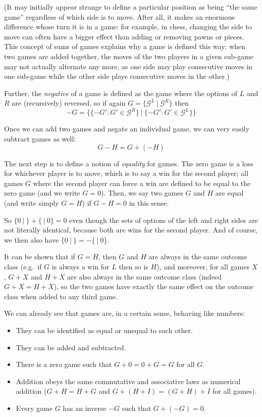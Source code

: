 \documentclass[a4paper,twocolumn]{article}
\newcommand{\cgtgame}[2]{\{#1 \:|\: #2\}}
\begin{document}
(It may initially appear strange to define a particular position as
being ``the same game'' regardless of which side is to move. After
all, it makes an enormous difference whose turn it is in a game: for
example, in chess, changing the side to move can often have a bigger
effect than adding or removing pawns or pieces. This concept of sums
of games explains why a game is defined this way: when two games are
added together, the moves of the two players in a given sub-game may
not actually alternate any more, as one side may play consecutive
moves in one sub-game while the other side plays consecutive moves in
the other.)

Further, the \emph{negative} of a game is defined as the game where
the options of $L$ and $R$ are (recursively) reversed, so if again $G
= \cgtgame{\mathcal{G}^L}{\mathcal{G}^R}$ then $$-G = \cgtgame{\{-G' :
  G' \in \mathcal{G}^R\}}{\{-G' : G' \in \mathcal{G}^L\}}$$

Once we can add two games and negate an individual game, we can very
easily subtract games as well: $$G - H = G + (-H)$$

The next step is to define a notion of \emph{equality} for games. The
zero game is a loss for whichever player is to move, which is to say a
win for the second player; all games $G$ where the second player can
force a win are defined to be equal to the zero game (and we write $G
= 0$). Then, we say two games $G$ and $H$ are equal (and write simply
$G = H$) if $G - H = 0$ in this sense.

So $\cgtgame{0}{} + \cgtgame{}{0} = 0$ even though the sets of options
of the left and right sides are not literally identical, because both
are wins for the second player. And of course, we then also have
$\cgtgame{0}{} = -\cgtgame{}{0}$.

It can be shown that if $G = H$, then $G$ and $H$ are always in the
same outcome class (e.g.\ if $G$ is always a win for $L$ then so is
$H$), and moreover, for all games $X$, $G+X$ and $H+X$ are also always
in the same outcome class (indeed $G+X = H+X$), so the two games have
exactly the same effect on the outcome class when added to any third
game.

We can already see that games are, in a certain sense, behaving like
numbers:

\begin{itemize}
  \item They can be identified as equal or unequal to each other.
  \item They can be added and subtracted.
  \item There is a zero game such that $G + 0 = 0 + G = G$ for all $G$.
  \item Addition obeys the same commutative and associative laws as
    numerical addition ($G+H = H+G$ and $G+(H+I)=(G+H)+I$ for all
    games).
  \item Every game $G$ has an inverse $-G$ such that $G + (-G) = 0$.
\end{itemize}
\end{document}
